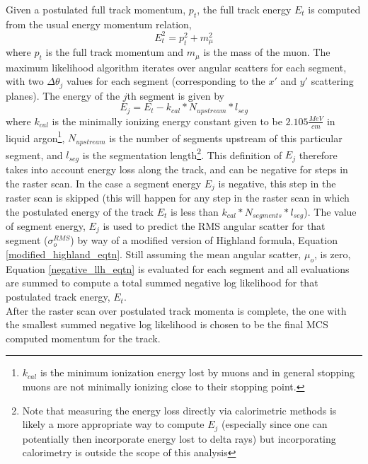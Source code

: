 Given a postulated full track momentum, $p_t$, the full track energy $E_t$ is computed from the usual energy momentum relation,
\begin{equation}\label{energy_momentum_relation_eqtn}
E_t^2 = p_t^2 + m_\mu^2
\end{equation}
 where $p_t$ is the full track momentum and $m_\mu$ is the mass of the muon. The maximum likelihood algorithm iterates over angular scatters for each segment, with two $\Delta\theta_j$ values for each segment (corresponding to the $x'$ and $y'$ scattering planes). The energy of the $j$th segment is given by
\begin{equation}\label{segment_E_equation}
E_{j} = E_t - k_{cal}*N_{upstream}*l_{seg}
\end{equation}
where $k_{cal}$ is the minimally ionizing energy constant given to be $2.105 \frac{MeV}{cm}$ in liquid argon\cite{MIPenergysource}\footnote{$k_{cal}$ is the minimum ionization energy lost by muons and in general stopping muons are not minimally ionizing close to their stopping point.}, $N_{upstream}$ is the number of segments upstream of this particular segment, and $l_{seg}$ is the segmentation length\footnote{Note that measuring the energy loss directly via calorimetric methods is likely a more appropriate way to compute $E_j$ (especially since one can potentially then incorporate energy lost to delta rays) but incorporating calorimetry is outside the scope of this analysis}. This definition of $E_j$ therefore takes into account energy loss along the track, and can be negative for steps in the raster scan. In the case a segment energy $E_j$ is negative, this step in the raster scan is skipped (this will happen for any step in the raster scan in which the postulated energy of the track $E_t$ is less than $k_{cal}*N_{segments}*l_{seg}$). The value of segment energy, $E_j$ is used to predict the RMS angular scatter for that segment ($\sigma_o^{RMS}$) by way of a modified version of Highland formula, Equation \ref{modified_highland_eqtn}. Still assuming the mean angular scatter, $\mu_o$, is zero, Equation \ref{negative_llh_eqtn} is evaluated for each segment and all evaluations are summed to compute a total summed negative log likelihood for that postulated track energy, $E_t$.\\

After the raster scan over postulated track momenta is complete, the one with the smallest summed negative log likelihood is chosen to be the final MCS computed momentum for the track.
